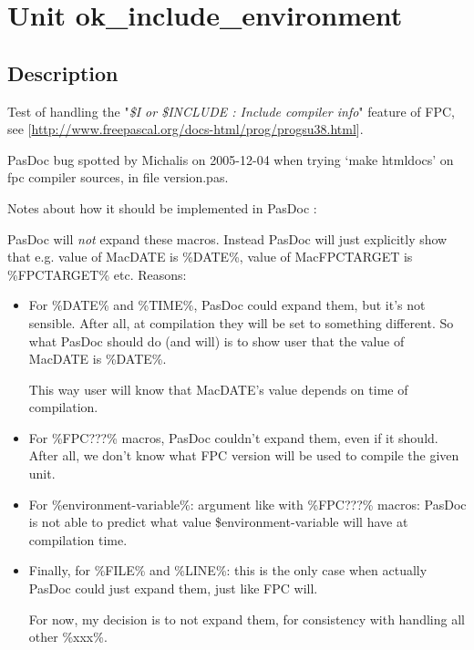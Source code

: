 \documentclass{report}
\begin{document}
\label{toc}\tableofcontents
\newpage
\newlength{\tmplength}
\chapter{Unit ok{\_}include{\_}environment}
\label{ok_include_environment}
\section{Description}
Test of handling the "\textit{{\$}I or {\$}INCLUDE : Include compiler info}" feature of FPC, see [\href{http://www.freepascal.org/docs-html/prog/progsu38.html}{http://www.freepascal.org/docs-html/prog/progsu38.html}].\hfill\vspace*{1ex}



PasDoc bug spotted by Michalis on 2005{-}12{-}04 when trying `make htmldocs' on fpc compiler sources, in file version.pas.

Notes about how it should be implemented in PasDoc :

PasDoc will \textit{not} expand these macros. Instead PasDoc will just explicitly show that e.g. value of MacDATE is {\%}DATE{\%}, value of MacFPCTARGET is {\%}FPCTARGET{\%} etc. Reasons: \begin{itemize}
\item For {\%}DATE{\%} and {\%}TIME{\%}, PasDoc could expand them, but it's not sensible. After all, at compilation they will be set to something different. So what PasDoc should do (and will) is to show user that the value of MacDATE is {\%}DATE{\%}.

This way user will know that MacDATE's value depends on time of compilation.
\item For {\%}FPC???{\%} macros, PasDoc couldn't expand them, even if it should. After all, we don't know what FPC version will be used to compile the given unit.
\item For {\%}environment{-}variable{\%}: argument like with {\%}FPC???{\%} macros: PasDoc is not able to predict what value {\$}environment{-}variable will have at compilation time.
\item Finally, for {\%}FILE{\%} and {\%}LINE{\%}: this is the only case when actually PasDoc could just expand them, just like FPC will.

For now, my decision is to not expand them, for consistency with handling all other {\%}xxx{\%}.
\end{itemize}
\end{document}
